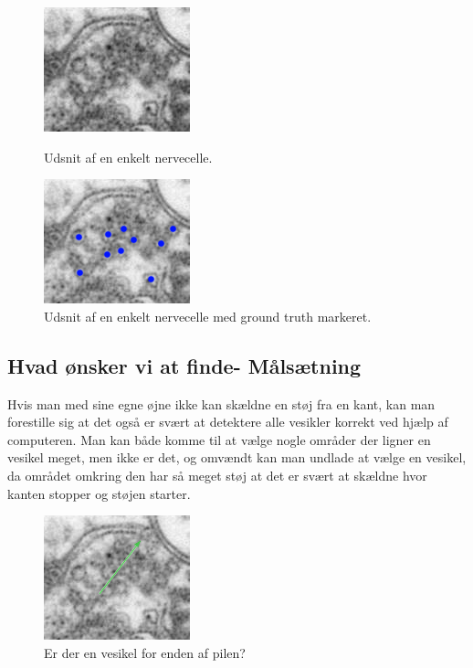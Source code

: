 \begin{figure}[ht]
	\begin{minipage}[b]{0.5\linewidth}
		\centering
		\includegraphics[scale=1.5]{files/intro/img/celle.png}
		\caption{Udsnit af en enkelt nervecelle.\label{fig:intro_celle}}
	\end{minipage}
	\hspace{0.5cm}
	\begin{minipage}[b]{0.5\linewidth}
		\centering
		\includegraphics[scale=1.5]{files/intro/img/celle_groundtruth.png}
		\caption{Udsnit af en enkelt nervecelle med ground truth markeret.\label{fig:intro_celle_groundtruth}}
	\end{minipage}
\end{figure}
  

\subsection{Hvad ønsker vi at finde- Målsætning}			%
Hvis man med sine egne øjne ikke kan skældne en støj fra en kant, kan man forestille sig at det også er svært at detektere alle vesikler korrekt ved hjælp af computeren. Man kan både komme til at vælge nogle områder der ligner en vesikel meget, men ikke er det, og omvændt kan man undlade at vælge en vesikel, da området omkring den har så meget støj at det er svært at skældne hvor kanten stopper og støjen starter. 

\begin{figure}[H]
	\centering
	\includegraphics[scale=1.5]{files/intro/img/celle_questionves.png}
	\caption{Er der en vesikel for enden af pilen?\label{fig:intro_celle_question}}
\end{figure}

